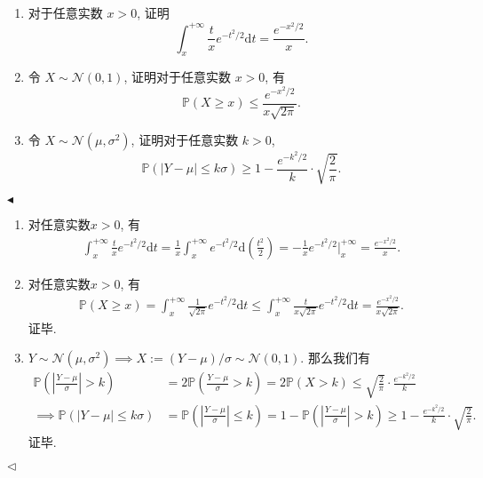 \documentclass[11pt]{article}
\newenvironment{problem}[2][Problem]{\begin{trivlist}
    \item[\hskip \labelsep {\bfseries #1}\hskip \labelsep {\bfseries #2.}]\songti}{\hfill$\blacktriangleleft$\end{trivlist}}
\newenvironment{answer}[1][Solution]{\begin{trivlist}
    \item[\hskip \labelsep {\bfseries #1.}\hskip \labelsep]}{\hfill$\lhd$\end{trivlist}}
\newcommand\1{\mathds{1}}
\newcommand\NN{\mathcal{N}}
\newcommand\PP{\mathbb{P}}
\newcommand\dd{\mathrm{d}}
\begin{document}
\begin{problem}{3}
\begin{enumerate}[label=(\arabic*)]
    \item 对于任意实数 $x>0$, 证明 \[\int_{x}^{+\infty}\frac{t}{x}e^{-t^2/2}\dd t = \frac{e^{-x^2/2}}{x}.\]
    \item 令 $X \sim \mathcal{N}(0,1)$, 证明对于任意实数 $x>0$, 有 \[\PP(X\ge x) \le \frac{e^{-x^2/2}}{x\sqrt{2\pi}}.\]  
    \item 令 $X \sim \mathcal{N}(\mu,\sigma^2)$, 证明对于任意实数 $k>0$, \[\PP(|Y-\mu| \le k\sigma) \ge 1 - \frac{e^{-k^2/2}}{k}\cdot \sqrt{\frac{2}{\pi}}.\]
\end{enumerate}
\end{problem}
\begin{answer}
    \begin{enumerate}[label = (\arabic*)]
        \item 对任意实数$x > 0$, 有
        \begin{align*}
            \int_{x}^{+\infty}\frac{t}{x} e^{-t^2/2} \dd t = \frac{1}{x}\int_{x}^{+\infty} e^{-t^2/2}\dd\left(\frac{t^2}{2}\right) = -\frac{1}{x}e^{-t^2/2}\bigg|_{x}^{+\infty} = \frac{e^{-x^2/2}}{x}.
        \end{align*}
        \item 对任意实数$x > 0$, 有
        \begin{align*}
            \PP(X\ge x) = \int_{x}^{+\infty} \frac{1}{\sqrt{2\pi}} e^{-t^2/2} \dd t \le \int_{x}^{+\infty} \frac{t}{x\sqrt{2\pi}} e^{-t^2/2} \dd t = \frac{e^{-x^2/2}}{x\sqrt{2\pi}}.
        \end{align*}
        证毕.
        \item $Y\sim\NN(\mu, \sigma^2) \implies X := (Y-\mu)/\sigma \sim \NN(0,1)$. 那么我们有
        \begin{align*}
            \PP\left(\left|\frac{Y-\mu}{\sigma}\right| > k\right) &= 2\PP\left(\frac{Y-\mu}{\sigma} > k\right) = 2\PP(X>k) \le \sqrt{\frac{2}{\pi}}\cdot\frac{e^{-k^2/2}}{k} \\
            \implies \PP(|Y-\mu|\le k\sigma) &= \PP\left(\left|\frac{Y-\mu}{\sigma}\right|\le k\right) = 1 - \PP\left(\left|\frac{Y-\mu}{\sigma}\right|> k\right) \ge 1 - \frac{e^{-k^2/2}}{k}\cdot \sqrt{\frac{2}{\pi}}.
        \end{align*}
        证毕.
    \end{enumerate}
\end{answer}
\end{document}
